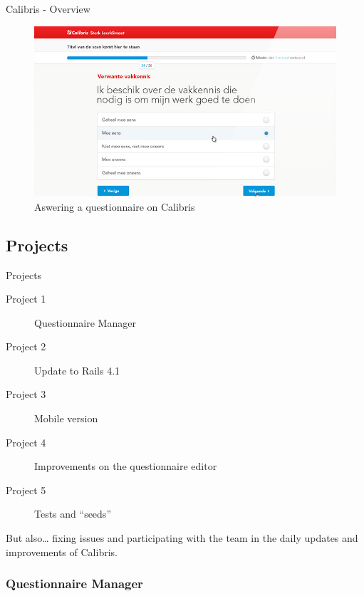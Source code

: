 \documentclass[10pt,a4paper]{beamer}
\begin{document}
\begin{frame}{Calibris - Overview}
  \begin{figure}[htp]
  \centering
  \includegraphics[scale=0.4]{../img/calibris2.png}
   \caption{Aswering a questionnaire on Calibris}
   \label{fig.calibris2}
  \end{figure}
\end{frame}

\subsection{Projects}

\begin{frame}{Projects}
  \begin{description}
    \item[Project 1] Questionnaire Manager
    \item[Project 2] Update to Rails 4.1
    \item[Project 3] Mobile version
    \item[Project 4] Improvements on the questionnaire editor
    \item[Project 5] Tests and ``seeds''
  \end{description}
  But also… fixing issues and participating with the team in the daily updates and improvements of Calibris.
\end{frame}

\subsubsection{Questionnaire Manager}
\end{document}

